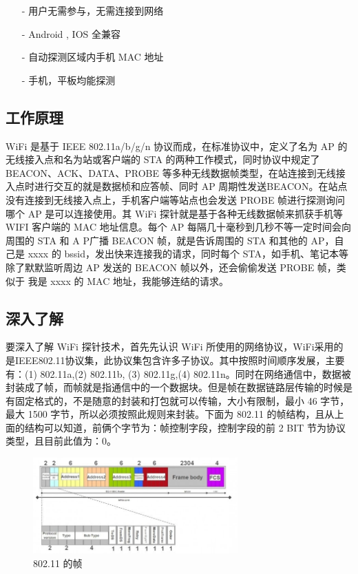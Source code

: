 \begin{itemize}
\item [-] 用户无需参与，无需连接到网络
\item [-] Android , IOS 全兼容
\item [-] 自动探测区域内手机 MAC 地址
\item [-] 手机，平板均能探测
\end{itemize}

\subsection{工作原理}

WiFi 是基于 IEEE 802.11a/b/g/n 协议而成，在标准协议中，定义了名为 AP 的无线接入点和名为站或客户端的 STA 的两种工作模式，同时协议中规定了 BEACON、ACK、DATA、PROBE 等多种无线数据帧类型，在站连接到无线接入点时进行交互的就是数据桢和应答帧、同时 AP 周期性发送BEACON。在站点没有连接到无线接入点上，手机客户端等站点也会发送 PROBE 帧进行探测询问哪个 AP 是可以连接使用。其 WiFi 探针就是基于各种无线数据帧来抓获手机等 WIFI 客户端的 MAC 地址信息。每个 AP 每隔几十毫秒到几秒不等一定时间会向周围的 STA 和 A P广播 BEACON 帧，就是告诉周围的 STA 和其他的 AP，自己是 xxxx 的 bssid，发出快来连接我的请求，同时每个 STA，如手机、笔记本等除了默默监听周边 AP 发送的 BEACON 帧以外，还会偷偷发送 PROBE 帧，类似于 我是 xxxx 的 MAC 地址，我能够连结的请求。

\subsection{深入了解}

要深入了解 WiFi 探针技术，首先先认识 WiFi 所使用的网络协议，WiFi采用的是IEEE802.11协议集，此协议集包含许多子协议。其中按照时间顺序发展，主要有：(1) 802.11a,(2) 802.11b, (3) 802.11g,(4) 802.11n。同时在网络通信中，数据被封装成了帧，而帧就是指通信中的一个数据块。但是帧在数据链路层传输的时候是有固定格式的，不是随意的封装和打包就可以传输，大小有限制，最小 46 字节，最大 1500 字节，所以必须按照此规则来封装。下面为 802.11 的帧结构，且从上面的结构可以知道，前俩个字节为：帧控制字段，控制字段的前 2 BIT 节为协议类型，且目前此值为：0。

\begin{figure}[htb]
\centering 
\includegraphics[width=0.70\textwidth]{img/ch1s5m1.jpg} 
\caption{802.11 的帧}
\label{Test}
\end{figure}

